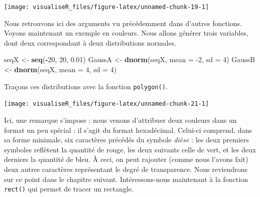 \documentclass[]{article}
\newenvironment{Shaded}{\begin{snugshade}}{\end{snugshade}}
\newcommand{\DataTypeTok}[1]{\textcolor[rgb]{0.13,0.29,0.53}{#1}}
\newcommand{\DecValTok}[1]{\textcolor[rgb]{0.00,0.00,0.81}{#1}}
\newcommand{\FloatTok}[1]{\textcolor[rgb]{0.00,0.00,0.81}{#1}}
\newcommand{\KeywordTok}[1]{\textcolor[rgb]{0.13,0.29,0.53}{\textbf{#1}}}
\newcommand{\NormalTok}[1]{#1}
\newcommand{\OperatorTok}[1]{\textcolor[rgb]{0.81,0.36,0.00}{\textbf{#1}}}
\newcommand{\StringTok}[1]{\textcolor[rgb]{0.31,0.60,0.02}{#1}}
\begin{document}
\begin{center}\texttt{[image: visualiseR\_files/figure-latex/unnamed-chunk-19-1]} \end{center}

Nous retrouvons ici des arguments vu précédemment dans d'autres fonctions. Voyons maintenant un exemple en couleurs. Nous allons générer trois variables, dont deux correspondant à deux distributions normales.

\begin{Shaded}
\begin{Highlighting}[]
\NormalTok{seqX <-}\StringTok{ }\KeywordTok{seq}\NormalTok{(}\OperatorTok{-}\DecValTok{20}\NormalTok{, }\DecValTok{20}\NormalTok{, }\FloatTok{0.01}\NormalTok{)}
\NormalTok{GaussA <-}\StringTok{ }\KeywordTok{dnorm}\NormalTok{(seqX, }\DataTypeTok{mean =} \DecValTok{-2}\NormalTok{, }\DataTypeTok{sd =} \DecValTok{4}\NormalTok{)}
\NormalTok{GaussB <-}\StringTok{ }\KeywordTok{dnorm}\NormalTok{(seqX, }\DataTypeTok{mean =} \DecValTok{4}\NormalTok{, }\DataTypeTok{sd =} \DecValTok{4}\NormalTok{)}
\end{Highlighting}
\end{Shaded}

Traçons ces distributions avec la fonction \texttt{polygon()}.

\begin{Shaded}
\end{Shaded}

\begin{center}\texttt{[image: visualiseR\_files/figure-latex/unnamed-chunk-21-1]} \end{center}

Ici, une remarque s'impose : nous venons d'attribuer deux couleurs dans un format un peu spécial : il s'agit du format hexadécimal. Celui-ci comprend, dans sa forme minimale, six caractères précédés du symbole \emph{dièse} : les deux premiers symboles reflètent la quantité de rouge, les deux suivants celle de vert, et les deux derniers la quantité de bleu. À ceci, on peut rajouter (comme nous l'avons fait) deux autres caractères représentant le degré de transparence. Nous reviendrons sur ce point dans le chapitre suivant.
Intéressons-nous maintenant à la fonction \texttt{rect()} qui permet de tracer un rectangle.
\end{document}
